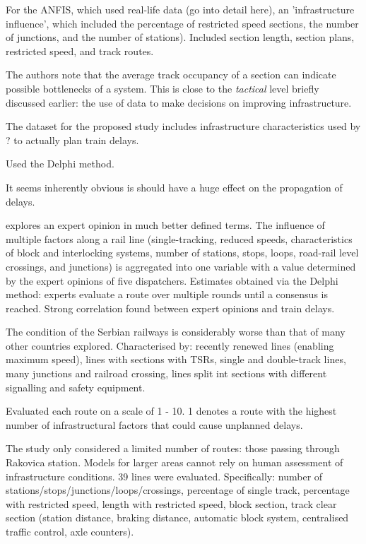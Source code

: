 \documentclass{article}
\begin{document}
For the ANFIS, which used real-life data (go into detail here), an 'infrastructure influence', which included the percentage of restricted speed sections, the number of junctions, and the number of stations). Included section length, section plans, restricted speed, and track routes. 

The authors note that the average track occupancy of a section can indicate possible bottlenecks of a system. This is close to the \textit{tactical} level briefly discussed earlier: the use of data to make decisions on improving infrastructure. 

The dataset for the proposed study includes infrastructure characteristics used by ? to actually plan train delays.

Used the Delphi method. 

It seems inherently obvious is should have a huge effect on the propagation of delays. 

\cite{markovic_et_al_2015} explores an expert opinion in much better defined terms. The influence of multiple factors along a rail line (single-tracking, reduced speeds, characteristics of block and interlocking systems, number of stations, stops, loops, road-rail level crossings, and junctions) is aggregated into one variable with a value determined by the expert opinions of five dispatchers. Estimates obtained via the Delphi method: experts evaluate a route over multiple rounds until a consensus is reached. Strong correlation found between expert opinions and train delays. 

The condition of the Serbian railways is considerably worse than that of many other countries explored. Characterised by: recently renewed lines (enabling maximum speed), lines with sections with TSRs, single and double-track lines, many junctions and railroad crossing, lines split int sections with different signalling and safety equipment. 

Evaluated each route on a scale of 1 - 10. 1 denotes a route with the highest number of infrastructural factors that could cause unplanned delays.

The study only considered a limited number of routes: those passing through Rakovica station. Models for larger areas cannot rely on human assessment of infrastructure conditions. 39 lines were evaluated. 
Specifically: number of stations/stops/junctions/loops/crossings, percentage of single track, percentage with restricted speed, length with restricted speed, block section, track clear section (station distance, braking distance, automatic block system, centralised traffic control, axle counters).
\end{document}
